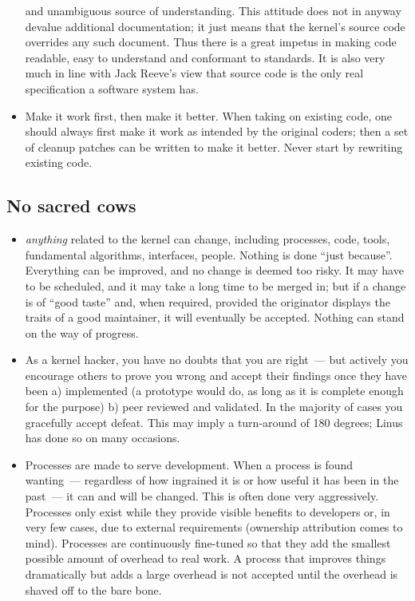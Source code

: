 \documentclass{memoir}
\begin{document}
\begin{itemize}
  and unambiguous source of understanding. This attitude does not in
  anyway devalue additional documentation; it just means that the
  kernel's source code overrides any such document. Thus there is a
  great impetus in making code readable, easy to understand and
  conformant to standards. It is also very much in line with Jack
  Reeve's view that source code is the only real specification a
  software system has.
\item Make it work first, then make it better. When taking on existing
  code, one should always first make it work as intended by the
  original coders; then a set of cleanup patches can be written to
  make it better. Never start by rewriting existing code.
\end{itemize}

\subsection{No sacred cows}

\begin{itemize}
\item \emph{anything} related to the kernel can change, including
  processes, code, tools, fundamental algorithms, interfaces,
  people. Nothing is done ``just because''. Everything can be
  improved, and no change is deemed too risky. It may have to be
  scheduled, and it may take a long time to be merged in; but if a
  change is of ``good taste'' and, when required, provided the
  originator displays the traits of a good maintainer, it will
  eventually be accepted. Nothing can stand on the way of progress.
\item As a kernel hacker, you have no doubts that you are right~---
  but actively you encourage others to prove you wrong and accept
  their findings once they have been a) implemented (a prototype would
  do, as long as it is complete enough for the purpose) b) peer
  reviewed and validated. In the majority of cases you gracefully
  accept defeat. This may imply a turn-around of 180 degrees; Linus
  has done so on many occasions.
\item Processes are made to serve development. When a process is found
  wanting~--- regardless of how ingrained it is or how useful it has
  been in the past~--- it can and will be changed. This is often done
  very aggressively. Processes only exist while they provide visible
  benefits to developers or, in very few cases, due to external
  requirements (ownership attribution comes to mind). Processes are
  continuously fine-tuned so that they add the smallest possible
  amount of overhead to real work. A process that improves things
  dramatically but adds a large overhead is not accepted until the
  overhead is shaved off to the bare bone.
\end{itemize}
\end{document}
